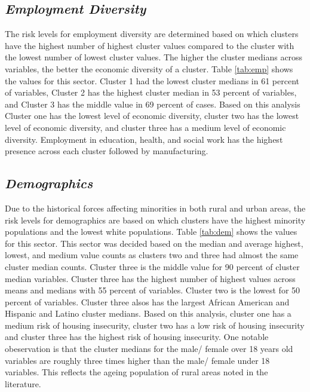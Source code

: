 \subsection{\textit{Employment Diversity}}
The risk levels for employment diversity are determined based on which clusters have the highest number of highest cluster values compared to the cluster with the lowest number of lowest cluster values. The higher the cluster medians across variables, the better the economic diversity of a cluster. Table \ref{tab:emp} shows the values for this sector. 
Cluster 1 had the lowest cluster medians in 61 percent of variables, 
Cluster 2 has the highest cluster median in 53 percent of variables, and Cluster 3 has the middle value in 69 %
percent of cases. Based on this analysis Cluster one has the lowest level of economic diversity, cluster two has the lowest level of economic diversity, and cluster three has a medium level of economic diversity. Employment in education, health, and social work has the highest presence across each cluster followed by manufacturing.




\subsection{\textit{Demographics}}

Due to the historical forces affecting minorities in both rural and urban areas, the risk levels for demographics are based on which clusters have the highest minority populations and the lowest white populations. 
Table \ref{tab:dem} shows the values for this sector.  This sector was decided based on the median and average highest, lowest, and medium value counts as clusters two and three had almost the same cluster median counts. Cluster three is the middle value for 90 percent of cluster median variables. Cluster three has the highest number of highest values across means and medians with 55 percent of variables. Cluster two is the lowest for 50 percent of variables. Cluster three alsos has the largest African American and Hispanic and Latino cluster medians. Based on this analysis, cluster one has a medium risk of housing insecurity, cluster two has a low risk of housing insecurity and cluster three has the highest risk of housing insecurity. One notable obeservation is that the cluster medians for the male/ female over 18 years old variables are roughly three times higher than the male/ female under 18 variables. This reflects the ageing population of rural areas noted in the literature. 

